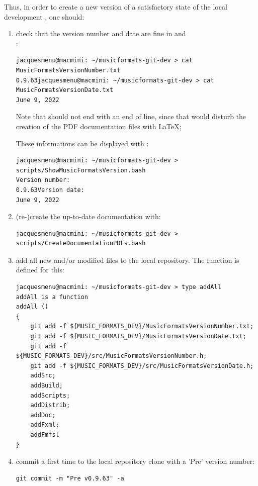Thus, in order to create a new version of a satisfactory state of the local development \repo, one should:
\begin{enumerate}

\item check that the version number and date are fine in  and \\:
\begin{lstlisting}[language=TerminalSmall]
jacquesmenu@macmini: ~/musicformats-git-dev > cat MusicFormatsVersionNumber.txt
0.9.63jacquesmenu@macmini: ~/musicformats-git-dev > cat MusicFormatsVersionDate.txt
June 9, 2022
\end{lstlisting}
Note that  should not end with an end of line, since that would disturb the creation of the PDF documentation files with \LaTeX;

These informations can be displayed with :
\begin{lstlisting}[language=Terminal]
jacquesmenu@macmini: ~/musicformats-git-dev > scripts/ShowMusicFormatsVersion.bash
Version number:
0.9.63Version date:
June 9, 2022
\end{lstlisting}


\item (re-)create the up-to-date documentation with:
\begin{lstlisting}[language=TerminalSmall]
jacquesmenu@macmini: ~/musicformats-git-dev > scripts/CreateDocumentationPDFs.bash
\end{lstlisting}


\item add all new and/or modified files to the local repository. The  function is defined for this:
\begin{lstlisting}[language=Terminal]
jacquesmenu@macmini: ~/musicformats-git-dev > type addAll
addAll is a function
addAll ()
{
    git add -f ${MUSIC_FORMATS_DEV}/MusicFormatsVersionNumber.txt;
    git add -f ${MUSIC_FORMATS_DEV}/MusicFormatsVersionDate.txt;
    git add -f ${MUSIC_FORMATS_DEV}/src/MusicFormatsVersionNumber.h;
    git add -f ${MUSIC_FORMATS_DEV}/src/MusicFormatsVersionDate.h;
    addSrc;
    addBuild;
    addScripts;
    addDistrib;
    addDoc;
    addFxml;
    addFmfsl
}
\end{lstlisting}


\item commit a first time to the local repository clone with a 'Pre' version number:
\begin{lstlisting}[language=Terminal]
git commit -m "Pre v0.9.63" -a
\end{lstlisting}



\end{enumerate}
